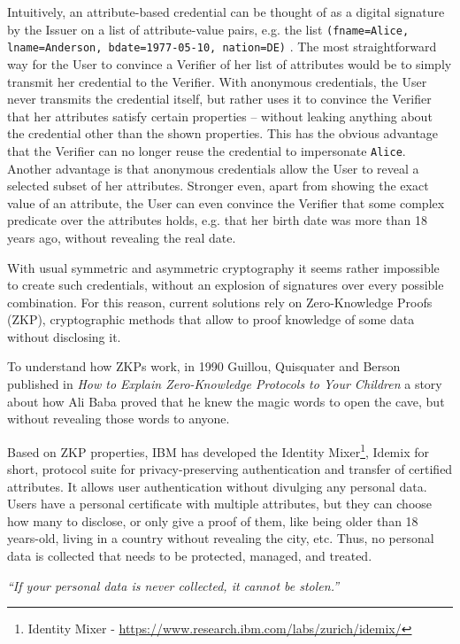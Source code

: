 \documentclass[journal]{IEEEtran}
\begin{document}
Intuitively, an attribute-based credential can be thought of as a digital signature by the Issuer on a list of attribute-value pairs, e.g. the list \texttt{(fname=Alice, lname=Anderson, bdate=1977-05-10, nation=DE)} \cite{introCredIBM}.
The most straightforward way for the User to convince a Verifier of her list of attributes would be to simply transmit her credential to the Verifier.
With anonymous credentials, the User never transmits the credential itself, but rather uses it to convince the Verifier that her attributes satisfy certain properties – without leaking anything about the credential other than the shown properties. This has the obvious advantage that the Verifier can no longer reuse the credential to impersonate \texttt{Alice}. Another advantage is that anonymous credentials allow the User to reveal a selected subset of her attributes.
Stronger even, apart from showing the exact value of an attribute, the User can even convince the
Verifier that some complex predicate over the attributes holds, e.g. that her birth date was more than 18 years ago, without revealing the real date.

With usual symmetric and asymmetric cryptography it seems rather impossible to create such credentials, without an explosion of signatures over every possible combination. For this reason, current solutions rely on  Zero-Knowledge Proofs (ZKP), cryptographic methods that allow to proof knowledge of some data without disclosing it.

To understand how ZKPs work, in 1990 Guillou, Quisquater and Berson published in \textit{How to Explain Zero-Knowledge Protocols to Your Children} \cite{ZKPcave:story} a story about how Ali Baba proved that he knew the magic words to open the cave, but without revealing those words to anyone.

Based on ZKP properties, IBM has developed the Identity Mixer\footnote{Identity Mixer - \url{https://www.research.ibm.com/labs/zurich/idemix/}}, Idemix for short, protocol suite for privacy-preserving authentication and transfer of certified attributes. It allows user authentication without divulging any personal data. Users have a personal certificate with multiple attributes, but they can choose how many to disclose, or only give a proof of them, like being older than 18 years-old, living in a country without revealing the city, etc. Thus, no personal data is collected that needs to be protected, managed, and treated.

\begin{center}
	\textit{``If your personal data is never collected, it cannot be stolen.''}
\end{center}
\end{document}
